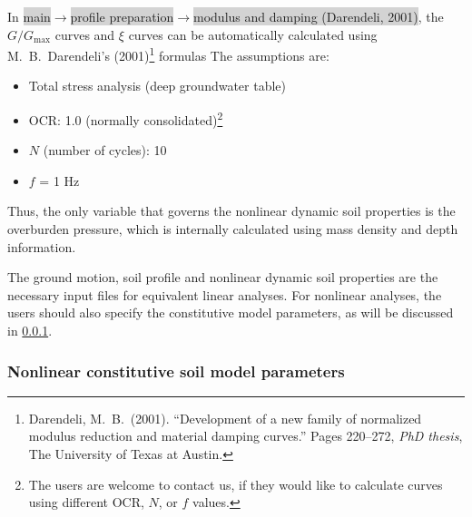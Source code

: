 \documentclass[11pt,letterpaper]{article}
\newcommand{\panel}[1]{\colorbox{lightgray}{\textsf{#1}}}
\begin{document}
In \panel{main}$\rightarrow$\panel{profile preparation}$\rightarrow$\panel{modulus and damping (Darendeli, 2001)}, the $G/G_{\max}$ curves and $\xi$ curves can be automatically calculated using M.~B.~Darendeli's (2001)\footnote{Darendeli, M.~B.~(2001). ``Development of a new family of normalized modulus reduction and material damping curves.'' Pages 220--272, \emph{PhD thesis}, The University of Texas at Austin.} formulas The assumptions are:
\begin{itemize}
\item Total stress analysis (deep groundwater table)
\item OCR: 1.0 (normally consolidated)\footnote{The users are welcome to contact us, if they would like to calculate curves using different OCR, $N$, or $f$ values.}
\item $N$ (number of cycles): 10
\item $f$ = 1 Hz
\end{itemize}

Thus, the only variable that governs the nonlinear dynamic soil properties is the overburden pressure, which is internally calculated using mass density and depth information.

The ground motion, soil profile and nonlinear dynamic soil properties are the necessary input files for equivalent linear analyses. For nonlinear analyses, the users should also specify the constitutive model parameters, as will be discussed in \ref{sec:para}.

\subsubsection{Nonlinear constitutive soil model parameters}\label{sec:para}
\end{document}
